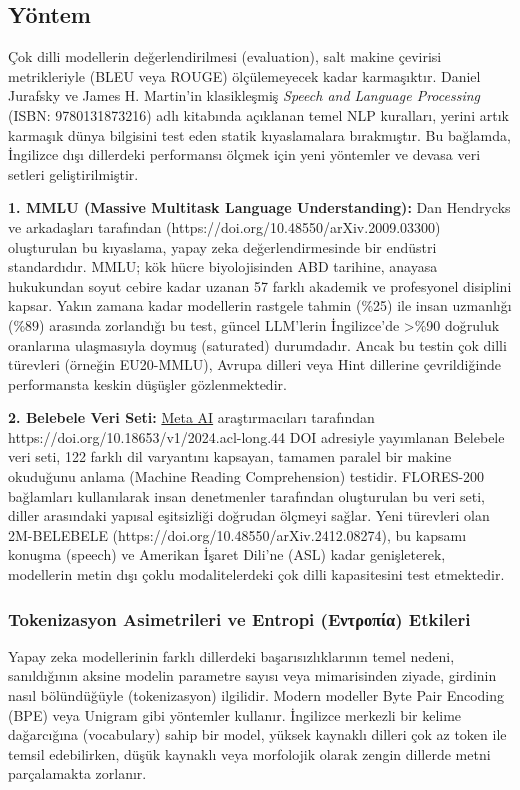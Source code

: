 \documentclass[11pt,a4paper]{article}
\begin{document}
\subsection{Yöntem}
Çok dilli modellerin değerlendirilmesi (evaluation), salt makine çevirisi metrikleriyle (BLEU veya ROUGE) ölçülemeyecek kadar karmaşıktır. Daniel Jurafsky ve James H. Martin'in klasikleşmiş \textit{Speech and Language Processing} (ISBN: 9780131873216) adlı kitabında açıklanan temel NLP kuralları, yerini artık karmaşık dünya bilgisini test eden statik kıyaslamalara bırakmıştır. Bu bağlamda, İngilizce dışı dillerdeki performansı ölçmek için yeni yöntemler ve devasa veri setleri geliştirilmiştir.

\textbf{1. MMLU (Massive Multitask Language Understanding):} Dan Hendrycks ve arkadaşları tarafından (https://doi.org/10.48550/arXiv.2009.03300) oluşturulan bu kıyaslama, yapay zeka değerlendirmesinde bir endüstri standardıdır. MMLU; kök hücre biyolojisinden ABD tarihine, anayasa hukukundan soyut cebire kadar uzanan 57 farklı akademik ve profesyonel disiplini kapsar. Yakın zamana kadar modellerin rastgele tahmin (\%25) ile insan uzmanlığı (\%89) arasında zorlandığı bu test, güncel LLM'lerin İngilizce'de >\%90 doğruluk oranlarına ulaşmasıyla doymuş (saturated) durumdadır. Ancak bu testin çok dilli türevleri (örneğin EU20-MMLU), Avrupa dilleri veya Hint dillerine çevrildiğinde performansta keskin düşüşler gözlenmektedir.

\textbf{2. Belebele Veri Seti:} \href{https://ai.meta.com/}{Meta AI} araştırmacıları tarafından https://doi.org/10.18653/v1/2024.acl-long.44 DOI adresiyle yayımlanan Belebele veri seti, 122 farklı dil varyantını kapsayan, tamamen paralel bir makine okuduğunu anlama (Machine Reading Comprehension) testidir. FLORES-200 bağlamları kullanılarak insan denetmenler tarafından oluşturulan bu veri seti, diller arasındaki yapısal eşitsizliği doğrudan ölçmeyi sağlar. Yeni türevleri olan 2M-BELEBELE (https://doi.org/10.48550/arXiv.2412.08274), bu kapsamı konuşma (speech) ve Amerikan İşaret Dili'ne (ASL) kadar genişleterek, modellerin metin dışı çoklu modalitelerdeki çok dilli kapasitesini test etmektedir.

\subsubsection{Tokenizasyon Asimetrileri ve Entropi (Εντροπία) Etkileri}
Yapay zeka modellerinin farklı dillerdeki başarısızlıklarının temel nedeni, sanıldığının aksine modelin parametre sayısı veya mimarisinden ziyade, girdinin nasıl bölündüğüyle (tokenizasyon) ilgilidir. Modern modeller Byte Pair Encoding (BPE) veya Unigram gibi yöntemler kullanır. İngilizce merkezli bir kelime dağarcığına (vocabulary) sahip bir model, yüksek kaynaklı dilleri çok az token ile temsil edebilirken, düşük kaynaklı veya morfolojik olarak zengin dillerde metni parçalamakta zorlanır.
\end{document}

